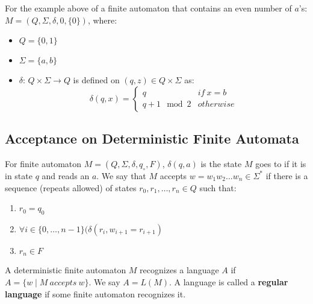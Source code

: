 \documentclass{math}
\begin{document}
For the example above of a finite automaton that contains an even number of
\( a \)'s: \( M = (Q,\Sigma,\delta,0,\{0\}) \), where:
\begin{itemize}
  \item \( Q = \{0,1\} \)
  \item \( \Sigma = \{a,b\} \)
  \item \( \delta \): \( Q\times\Sigma\to Q \) is defined on \( (q,z)\in
    Q\times\Sigma \) as:
    \[ \delta(q,x) = \begin{cases}
      q & if\ x = b \\
      q+1\mod2 & otherwise
    \end{cases} \]
\end{itemize}

\subsection*{Acceptance on Deterministic Finite Automata}
For finite automaton \( M = (Q,\Sigma,\delta,q_{\circ},F) \), \( \delta(q,a) \)
is the state \( M \) goes to if it is in state \( q \) and reads an \( a \).
We say that \( M \) accepts \( w = w_1w_2\dots w_n\in\Sigma^{*} \) if there is
a sequence (repeats allowed) of states \( r_0,r_1,\dots,r_n\in Q \) such that:
\begin{enumerate}
  \item \( r_0 = q_0 \)
  \item \( \forall{i}\in\{0,\dots,n-1\}(\delta(r_i,w_{i+1} = r_{i+1}) \)
  \item \( r_n \in F \)
\end{enumerate}
A deterministic finite automaton \( M \) recognizes a language \( A \) if
\( A = \{w\mid M\ accepts\ w\} \). We say \( A = L(M) \). A language is called
a \textbf{regular language} if some finite automaton recognizes it.
\end{document}
